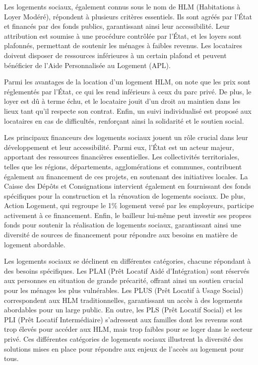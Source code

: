 \documentclass[a4paper, 12pt]{report}
\begin{document}
Les logements sociaux, également connus sous le nom de HLM (Habitations à Loyer Modéré), répondent à plusieurs critères essentiels. Ils sont agréés par l'État et financés par des fonds publics, garantissant ainsi leur accessibilité. Leur attribution est soumise à une procédure contrôlée par l'État, et les loyers sont plafonnés, permettant de soutenir les ménages à faibles revenus. Les locataires doivent disposer de ressources inférieures à un certain plafond et peuvent bénéficier de l'Aide Personnalisée au Logement (APL). 

Parmi les avantages de la location d'un logement HLM, on note que les prix sont réglementés par l'État, ce qui les rend inférieurs à ceux du parc privé. De plus, le loyer est dû à terme échu, et le locataire jouit d'un droit au maintien dans les lieux tant qu'il respecte son contrat. Enfin, un suivi individualisé est proposé aux locataires en cas de difficultés, renforçant ainsi la solidarité et le soutien social.

Les principaux financeurs des logements sociaux jouent un rôle crucial dans leur développement et leur accessibilité. Parmi eux, l'État est un acteur majeur, apportant des ressources financières essentielles. Les collectivités territoriales, telles que les régions, départements, agglomérations et communes, contribuent également au financement de ces projets, en soutenant des initiatives locales. La Caisse des Dépôts et Consignations intervient également en fournissant des fonds spécifiques pour la construction et la rénovation de logements sociaux. De plus, Action Logement, qui regroupe le 1\% logement versé par les employeurs, participe activement à ce financement. Enfin, le bailleur lui-même peut investir ses propres fonds pour soutenir la réalisation de logements sociaux, garantissant ainsi une diversité de sources de financement pour répondre aux besoins en matière de logement abordable.

Les logements sociaux se déclinent en différentes catégories, chacune répondant à des besoins spécifiques. Les PLAI (Prêt Locatif Aidé d’Intégration) sont réservés aux personnes en situation de grande précarité, offrant ainsi un soutien crucial pour les ménages les plus vulnérables. Les PLUS (Prêt Locatif à Usage Social) correspondent aux HLM traditionnelles, garantissant un accès à des logements abordables pour un large public. En outre, les PLS (Prêt Locatif Social) et les PLI (Prêt Locatif Intermédiaire) s'adressent aux familles dont les revenus sont trop élevés pour accéder aux HLM, mais trop faibles pour se loger dans le secteur privé. Ces différentes catégories de logements sociaux illustrent la diversité des solutions mises en place pour répondre aux enjeux de l'accès au logement pour tous.
\end{document}
